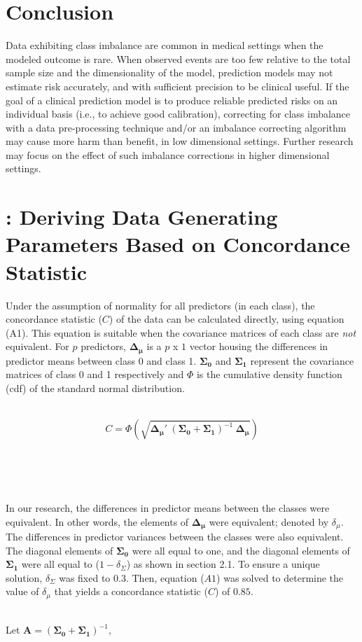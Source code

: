 \documentclass[AMA,STIX1COL,]{WileyNJD-v2}
\begin{document}
\hypertarget{conclusion}{%
\section{Conclusion}\label{conclusion}}

Data exhibiting class imbalance are common in medical settings when the
modeled outcome is rare. When observed events are too few relative to
the total sample size and the dimensionality of the model, prediction
models may not estimate risk accurately, and with sufficient precision
to be clinical useful. If the goal of a clinical prediction model is to
produce reliable predicted risks on an individual basis (i.e., to
achieve good calibration), correcting for class imbalance with a data
pre-processing technique and/or an imbalance correcting algorithm may
cause more harm than benefit, in low dimensional settings. Further
research may focus on the effect of such imbalance corrections in higher
dimensional settings.

\newpage

\appendix

\section{:  Deriving Data Generating Parameters Based on Concordance Statistic}

\hfill\break
Under the assumption of normality for all predictors (in each class),
the concordance statistic (\(C\)) of the data can be calculated
directly, using equation (A1). This equation is suitable when the
covariance matrices of each class are \emph{not} equivalent. For \(p\)
predictors, \(\pmb{\Delta_\mu}\) is a \(p\) x \(1\) vector housing the
differences in predictor means between class 0 and class 1.
\(\pmb{\Sigma_0}\) and \(\pmb{\Sigma_1}\) represent the covariance
matrices of class 0 and 1 respectively and \(\Phi\) is the cumulative
density function (cdf) of the standard normal distribution.\\
\strut \\
\begin{equation} \tag{A1}
C = \Phi \left( \sqrt{\pmb{\Delta_\mu}{'}\  (\pmb{\Sigma_0} + \pmb{\Sigma_1})^{-1} \ \pmb{\Delta_{\mu}}} \right)
\end{equation}\\
\strut \\
\strut \\
In our research, the differences in predictor means between the classes
were equivalent. In other words, the elements of \(\pmb{\Delta_\mu}\)
were equivalent; denoted by \(\delta_\mu\). The differences in predictor
variances between the classes were also equivalent. The diagonal
elements of \(\pmb{\Sigma_0}\) were all equal to one, and the diagonal
elements of \(\pmb{\Sigma_1}\) were all equal to (\(1- \delta_\Sigma\))
as shown in section 2.1. To ensure a unique solution, \(\delta_\Sigma\)
was fixed to \(0.3\). Then, equation (\(A1\)) was solved to determine
the value of \(\delta_\mu\) that yields a concordance statistic (\(C\))
of \(0.85\).\\
\strut \\
Let \(\pmb{A} = (\pmb{\Sigma_0} + \pmb{\Sigma_1})^{-1}\),
\end{document}
